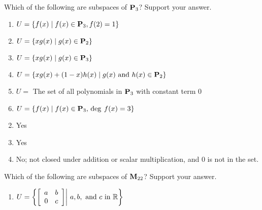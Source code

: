 \begin{multicols}{2}
\begin{ex}
Which of the following are subspaces of $\textbf{P}_{3}$? Support your answer.

\begin{enumerate}[label={\alph*.}]
\item $U = \{f(x) \mid f(x) \in \textbf{P}_{3}, f(2) = 1\}$

\item $U = \{xg(x) \mid g(x) \in \textbf{P}_{2}\}$

\item $U = \{xg(x) \mid g(x) \in \textbf{P}_{3}\}$

\item $U = \{xg(x) + (1 - x)h(x) \mid g(x) \mbox{ and } h(x) \in \textbf{P}_{2}\}$

\item $U =$ The set of all polynomials in $\textbf{P}_{3}$ with constant term $0$

\item $U = \{f(x) \mid f(x) \in \textbf{P}_{3}, \thinspace\operatorname{deg\medspace} f(x) = 3\}$

\end{enumerate}
\begin{sol}
\begin{enumerate}[label={\alph*.}]
\setcounter{enumi}{1}
\item  Yes

\setcounter{enumi}{3}
\item  Yes

\setcounter{enumi}{5}
\item  No; not closed under addition or scalar multiplication, and $0$ is not in the set.

\end{enumerate}
\end{sol}
\end{ex}


\columnbreak
\begin{ex}
Which of the following are subspaces of $\textbf{M}_{22}$? Support your answer.

\begin{enumerate}[label={\alph*.}]
\item $U = \left\{
\left[ \begin{array}{rr}
a & b \\
0 & c
\end{array} \right]
\middle|\ a, b, \mbox{ and } c \mbox{ in } \mathbb{R} \right\}$


\end{enumerate}
\end{ex}
\end{multicols}
